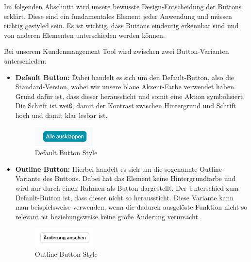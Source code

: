 Im folgenden Abschnitt wird unsere bewusste Design-Entscheidung der Buttons erklärt. Diese sind ein fundamentales Element jeder Anwendung und müssen richtig gestyled sein. Es ist wichtig, dass Buttons eindeutig erkennbar sind und von anderen Elementen unterschieden werden können.

Bei unserem Kundenmangement Tool wird zwischen zwei Button-Varianten unterschieden:

\begin{itemize}
    \item \textbf{Default Button:}
        \newline
        Dabei handelt es sich um den Default-Button, also die Standard-Version, wobei wir unsere blaue Akzent-Farbe verwendet haben. Grund dafür ist, dass dieser heraussticht und somit eine Aktion symbolisiert. Die Schrift ist weiß, damit der Kontrast zwischen Hintergrund und Schrift hoch und damit klar lesbar ist.
        \begin{figure}[h!]
            \centering
            \includegraphics[width=0.3\textwidth]{pics/button-default.png}
            \caption{Default Button Style}
            \label{fig:mesh1}
        \end{figure}
\newpage
    \item \textbf{Outline Button:}
        \newline
        Hierbei handelt es sich um die sogenannte Outline-Variante des Buttons. Dabei hat das Element keine Hintergrundfarbe und wird nur durch einen Rahmen als Button dargestellt. Der Unterschied zum Default-Button ist, dass dieser nicht so heraussticht. Diese Variante kann man beispielsweise verwenden, wenn die dadurch ausgelöste Funktion nicht so relevant ist beziehungsweise keine große Änderung verursacht.
        \begin{figure}[h!]
            \centering
            \includegraphics[width=0.3\textwidth]{pics/button-outline.png}
            \caption{Outline Button Style}
            \label{fig:mesh1}
        \end{figure}
\end{itemize}